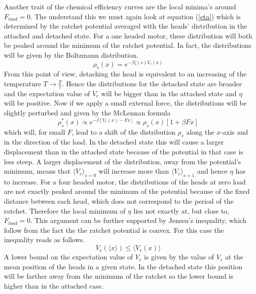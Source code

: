 \documentclass[aps,pre,twocolumn,showpacs,showkeys]{revtex4-1}
\begin{document}
Another trait of the chemical efficiency curves are the local minima's around $F_{load}=0$. 
The understand this we must again look at equation (\ref{eta}) which is determined by the ratchet potential averaged with the heads' distribution in the attached and detached state. 
For a one headed motor, these distribution will both be peaked around the minimum of the ratchet potential. 
In fact, the distributions will be given by the Boltzmann distribution.
\begin{equation}
\rho_s (x) = e^{-\beta \zeta(s) V_r(x)}
\end{equation} 
From this point of view, detaching the head is equivalent to an increasing of the temperature $T\rightarrow\frac{T}{c}$. 
Hence the distributions for the detached state are broader and the expectation value of $V_r$ will be bigger than in the attached state and $\eta$ will be positive. 
Now if we apply a small external force, the distributions will be slightly perturbed and given by the McLennan formula
\begin{equation}
\rho_s^*(x) \propto e^{-\beta \left[V_r(x) - F x\right]}\propto \rho_s(x)\left[1 + \beta F x\right]
\end{equation}
which will, for small $F$, lead to a shift of the distribution $\rho_s$ along the $x$-axis and in the direction of the load. 
In the detached state this will cause a larger displacement than in the attached state because of the potential in that case is less steep. 
A larger displacement of the distribution, away from the potential's minimum, means that $\langle V_r \rangle_{s=0}$ will increase more than $\langle V_r \rangle_{s=1}$ and hence $\eta$ has to increase. 
For a four headed motor, the distributions of the heads at zero load are not exactly peaked around the minimum of the potential because of the fixed distance between each head,  which does not correspond to the period of the ratchet. 
Therefore the local minimum of $\eta$ lies not exactly at, but close to, $F_{load} =0$.
This argument can be further supported by Jensen's inequality, which follow from the fact the the ratchet potential is convex. For this case the inequality reads as follows.
\begin{equation}
V_r(\langle x \rangle) \leq \langle V_r(x) \rangle
\end{equation} 
A lower bound on the expectation value of $V_r$ is given by the value of $V_r$ at the mean position of the heads in a given state. 
In the detached state this position will be farther away from the minimum of the ratchet so the lower bound is higher than in the attached case.
\end{document}
